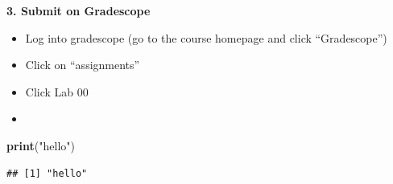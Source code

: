 \documentclass[
]{article}
\newenvironment{Shaded}{\begin{snugshade}}{\end{snugshade}}
\newcommand{\FunctionTok}[1]{\textcolor[rgb]{0.13,0.29,0.53}{\textbf{#1}}}
\newcommand{\NormalTok}[1]{#1}
\newcommand{\StringTok}[1]{\textcolor[rgb]{0.31,0.60,0.02}{#1}}
\begin{document}
\textbf{3. Submit on Gradescope}

\begin{itemize}
\item
  Log into gradescope (go to the course homepage and click
  ``Gradescope'')
\item
  Click on ``assignments''
\item
  Click Lab 00
\item
\end{itemize}

\begin{Shaded}
\begin{Highlighting}[]
\FunctionTok{print}\NormalTok{(}\StringTok{"hello"}\NormalTok{)}
\end{Highlighting}
\end{Shaded}

\begin{verbatim}
## [1] "hello"
\end{verbatim}
\end{document}

